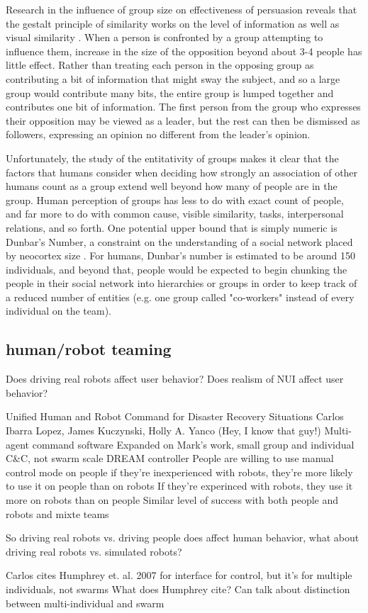 Research in the influence of group size on effectiveness of persuasion reveals that the gestalt principle of similarity works on the level of information as well as visual similarity \cite{wilder1977perception}. 
When a person is confronted by a group attempting to influence them, increase in the size of the opposition beyond about 3-4 people has little effect. 
Rather than treating each person in the opposing group as contributing a bit of information that might sway the subject, and so a large group would contribute many bits, the entire group is lumped together and contributes one bit of information. 
The first person from the group who expresses their opposition may be viewed as a leader, but the rest can then be dismissed as followers, expressing an opinion no different from the leader's opinion. 

Unfortunately, the study of the entitativity of groups makes it clear that the factors that humans consider when deciding how strongly an association of other humans count as a group extend well beyond how many of people are in the group.
Human perception of groups has less to do with exact count of people, and far more to do with common cause, visible similarity, tasks, interpersonal relations, and so forth. 
One potential upper bound that is simply numeric is Dunbar's Number, a constraint on the understanding of a social network placed by neocortex size \citep{dunbar1992neocortex}. 
For humans, Dunbar's number is estimated to be around 150 individuals, and beyond that, people would be expected to begin chunking the people in their social network into hierarchies or groups in order to keep track of a reduced number of entities (e.g. one group called "co-workers" instead of every individual on the team). 


\subsection{human/robot teaming}

Does driving real robots affect user behavior?
	Does realism of NUI affect user behavior?


Unified Human and Robot Command for Disaster Recovery Situations
Carlos Ibarra Lopez, James Kuczynski, Holly A. Yanco
	(Hey, I know that guy!)
	Multi-agent command software
		Expanded on Mark's work, small group and individual C\&C, not swarm scale
		DREAM controller
	People are willing to use manual control mode on people
		if they're inexperienced with robots, they're more likely to use it on people than on robots
		If they're experinced with robots, they use it more on robots than on people
	Similar level of success with both people and robots and mixte teams

So driving real robots vs. driving people does affect human behavior, what about driving real robots vs. simulated robots?


Carlos cites Humphrey et. al. 2007 for interface for control, but it's for multiple individuals, not swarms
	What does Humphrey cite? Can talk about distinction between multi-individual and swarm